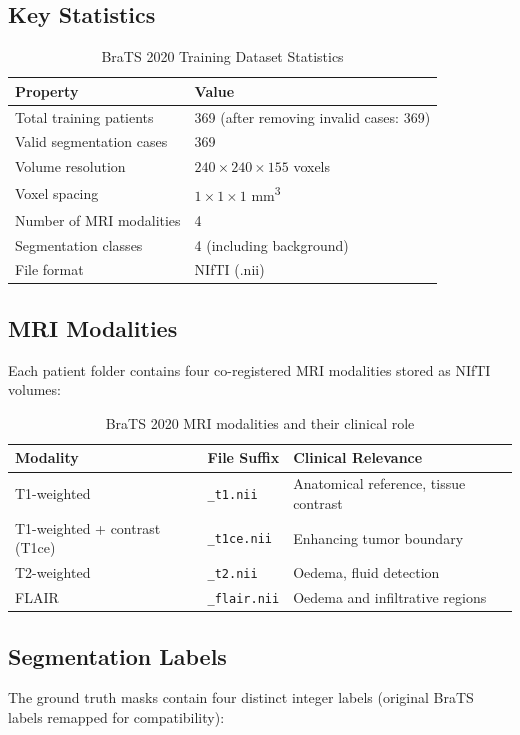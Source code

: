 \documentclass[12pt,a4paper]{report}
\begin{document}
\subsection{Key Statistics}
\begin{table}[H]
\centering
\caption{BraTS 2020 Training Dataset Statistics}
\label{tab:brats_stats}
\begin{tabular}{ll}
\toprule
\textbf{Property} & \textbf{Value} \\
\midrule
Total training patients & 369 (after removing invalid cases: 369) \\
Valid segmentation cases & 369 \\
Volume resolution & $240 \times 240 \times 155$ voxels \\
Voxel spacing & $1 \times 1 \times 1$ mm\textsuperscript{3} \\
Number of MRI modalities & 4 \\
Segmentation classes & 4 (including background) \\
File format & NIfTI (.nii) \\
\bottomrule
\end{tabular}
\end{table}

\subsection{MRI Modalities}
Each patient folder contains four co-registered MRI modalities stored as NIfTI volumes:

\begin{table}[H]
\centering
\caption{BraTS 2020 MRI modalities and their clinical role}
\label{tab:modalities}
\begin{tabular}{lll}
\toprule
\textbf{Modality} & \textbf{File Suffix} & \textbf{Clinical Relevance} \\
\midrule
T1-weighted & \texttt{\_t1.nii} & Anatomical reference, tissue contrast \\
T1-weighted + contrast (T1ce) & \texttt{\_t1ce.nii} & Enhancing tumor boundary \\
T2-weighted & \texttt{\_t2.nii} & Oedema, fluid detection \\
FLAIR & \texttt{\_flair.nii} & Oedema and infiltrative regions \\
\bottomrule
\end{tabular}
\end{table}

\subsection{Segmentation Labels}
The ground truth masks contain four distinct integer labels (original BraTS labels remapped for compatibility):
\end{document}
